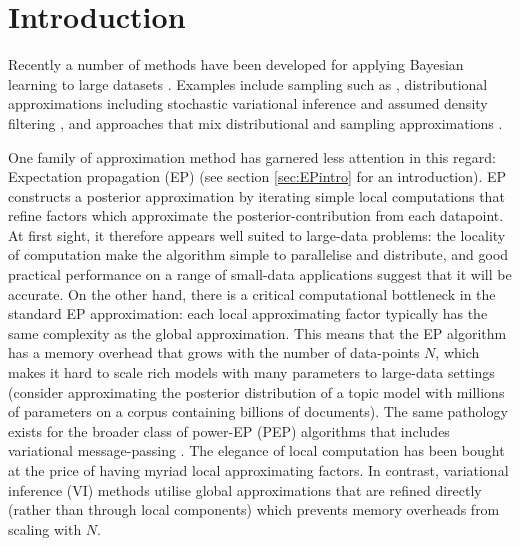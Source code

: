 \section{Introduction}

Recently a number of methods have been developed for applying Bayesian learning to large datasets . Examples include sampling such as \cite{ahn:distributedMCMC, bardenet:MCMC}, distributional approximations including stochastic variational inference \cite{hoffman:svi} and assumed density filtering \cite{miguel:pbp}, and approaches that mix distributional and sampling approximations \cite{gelman:dep,xu:sms}. 

One family of approximation method has garnered less attention in this regard: Expectation propagation (EP) \cite{minka:ep}\cite{opper:ec} (see section \ref{sec:EPintro} for an introduction). EP constructs a posterior approximation by iterating simple local computations that refine factors which approximate the posterior-contribution from each datapoint. At first sight, it therefore appears well suited to large-data problems: the locality of computation make the algorithm simple to parallelise and distribute, and good practical performance on a range of small-data applications suggest that it will be accurate\cite{kuss:gpep,barthelme:ep_likelihood,cunningham:gaussianEP}. On the other hand, there is a critical computational bottleneck in the standard EP approximation: each local approximating factor typically has the same complexity as the global approximation. This means that the EP algorithm has a memory overhead that grows with the number of data-points $N$, which makes it hard to scale rich models with many parameters to large-data settings (consider approximating the posterior distribution of a topic model with millions of parameters on a corpus containing billions of documents). The same pathology exists for the broader class of power-EP (PEP) algorithms \cite{minka:powerep} that includes variational message-passing \cite{winn:vmp}. The elegance of local computation has been bought at the price of having myriad local approximating factors. In contrast, variational inference (VI) methods \cite{jordan:variational,beal:variational} utilise global approximations that are refined directly (rather than through local components) which prevents memory overheads from scaling with $N$. 

